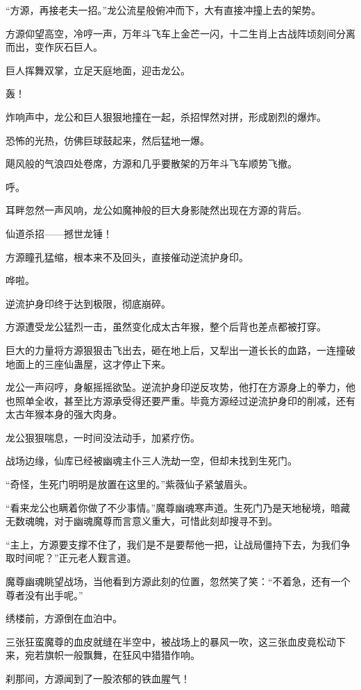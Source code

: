 \begin{this_body}
“方源，再接老夫一招。”龙公流星般俯冲而下，大有直接冲撞上去的架势。

方源仰望高空，冷哼一声，万年斗飞车上金芒一闪，十二生肖上古战阵顷刻间分离而出，变作灰石巨人。

巨人挥舞双掌，立足天庭地面，迎击龙公。

轰！

炸响声中，龙公和巨人狠狠地撞在一起，杀招悍然对拼，形成剧烈的爆炸。

恐怖的光热，仿佛巨球鼓起来，然后猛地一爆。

飓风般的气浪四处卷席，方源和几乎要散架的万年斗飞车顺势飞撤。

呼。

耳畔忽然一声风响，龙公如魔神般的巨大身影陡然出现在方源的背后。

仙道杀招——撼世龙锤！

方源瞳孔猛缩，根本来不及回头，直接催动逆流护身印。

哗啦。

逆流护身印终于达到极限，彻底崩碎。

方源遭受龙公猛烈一击，虽然变化成太古年猴，整个后背也差点都被打穿。

巨大的力量将方源狠狠击飞出去，砸在地上后，又犁出一道长长的血路，一连撞破地面上的三座仙蛊屋，这才停止下来。

龙公一声闷哼，身躯摇摇欲坠。逆流护身印逆反攻势，他打在方源身上的拳力，他也照单全收，甚至比方源承受得还要严重。毕竟方源经过逆流护身印的削减，还有太古年猴本身的强大肉身。

龙公狠狠喘息，一时间没法动手，加紧疗伤。

战场边缘，仙库已经被幽魂主仆三人洗劫一空，但却未找到生死门。

“奇怪，生死门明明是放置在这里的。”紫薇仙子紧皱眉头。

“看来龙公也瞒着你做了不少事情。”魔尊幽魂寒声道。生死门乃是天地秘境，暗藏无数魂魄，对于幽魂魔尊而言意义重大，可惜此刻却搜寻不到。

“主上，方源要支撑不住了，我们是不是要帮他一把，让战局僵持下去，为我们争取时间呢？”正元老人觐言道。

魔尊幽魂眺望战场，当他看到方源此刻的位置，忽然笑了笑：“不着急，还有一个尊者没有出手呢。”

绣楼前，方源倒在血泊中。

三张狂蛮魔尊的血皮就缝在半空中，被战场上的暴风一吹，这三张血皮竟松动下来，宛若旗帜一般飘舞，在狂风中猎猎作响。

刹那间，方源闻到了一股浓郁的铁血腥气！

\end{this_body}

